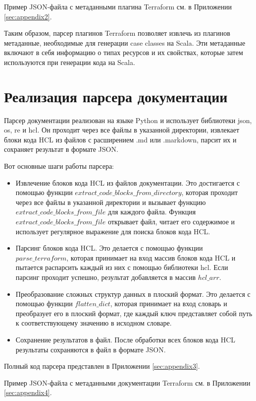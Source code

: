 Пример JSON-файла с метаданными плагина Terraform 
см. в Приложении \ref{sec:appendix2}.

Таким образом, парсер плагинов Terraform позволяет извлечь из плагинов
метаданные, необходимые для генерации case classes на Scala. Эти метаданные
включают в себя информацию о типах ресурсов и их свойствах, которые затем
используются при генерации кода на Scala.

\section{Реализация парсера документации}

Парсер документации реализован на языке Python и использует библиотеки json, os,
re и hcl. Он проходит через все файлы в указанной директории, извлекает блоки
кода HCL из файлов с расширением .md или .markdown, парсит их и сохраняет
результат в формате JSON.

Вот основные шаги работы парсера:


\begin{itemize}
  \item Извлечение блоков кода HCL из файлов документации. Это достигается с
помощью функции $extract\_code\_blocks\_from\_directory$, которая проходит через
все
файлы в указанной директории и вызывает функцию
$extract\_code\_blocks\_from\_file$
для каждого файла. Функция $extract\_code\_blocks\_from\_file$ открывает файл,
читает
его содержимое и использует регулярное выражение для поиска блоков кода HCL.
  \item Парсинг блоков кода HCL. Это делается с помощью функции
$parse\_terraform$,
которая принимает на вход массив блоков кода HCL и пытается распарсить каждый из
них с помощью библиотеки hcl. Если парсинг проходит успешно, результат
добавляется в массив $hcl\_arr$.
  \item Преобразование сложных структур данных в плоский формат. Это делается с
помощью функции $flatten\_dict$, которая принимает на вход словарь и преобразует
его в плоский формат, где каждый ключ представляет собой путь к соответствующему
значению в исходном словаре.
  \item Сохранение результатов в файл. После обработки всех блоков кода HCL
результаты сохраняются в файл в формате JSON.
\end{itemize}

Полный код парсера представлен в Приложении \ref{sec:appendix3}.

Пример JSON-файла с метаданными документации Terraform см. в Приложении
\ref{sec:appendix4}.

